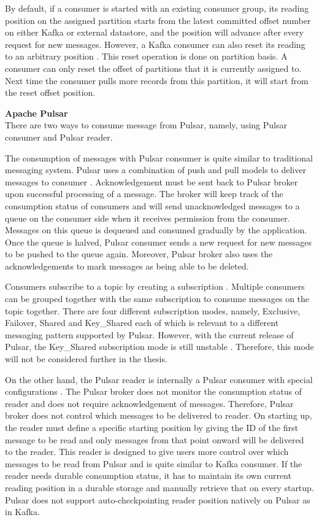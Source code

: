 By default, if a consumer is started with an existing consumer group, its reading position on the assigned partition starts from the latest committed offset number on either Kafka or external datastore, and the position will advance after every request for new messages. However, a Kafka consumer can also reset its reading to an arbitrary position \cite{kafkaconsumerimplement}. This reset operation is done on partition basis. A consumer can only reset the offset of partitions that it is currently assigned to. Next time the consumer pulls more records from this partition, it will start from the reset offset position.

\large \textbf{Apache Pulsar}\\
\normalsize
There are two ways to consume message from Pulsar, namely, using Pulsar consumer and Pulsar reader.

The consumption of messages with Pulsar consumer is quite similar to traditional messaging system. Pulsar uses a combination of push and pull models to deliver messages to consumer \cite{pulsarbinaryprotocol}. Acknowledgement must be sent back to Pulsar broker upon successful processing of a message. The broker will keep track of the consumption status of consumers and will send unacknowledged messages to a queue on the consumer side when it receives permission from the consumer. Messages on this queue is dequeued and consumed gradually by the application. Once the queue is halved, Pulsar consumer sends a new request for new messages to be pushed to the queue again. Moreover, Pulsar broker also uses the acknowledgements to mark messages as being able to be deleted.

Consumers subscribe to a topic by creating a subscription \cite{pulsarconsumersubscription}. Multiple consumers can be grouped together with the same subscription to consume messages on the topic together. There are four different subscription modes, namely, Exclusive, Failover, Shared and Key\_Shared each of which is relevant to a different messaging pattern supported by Pulsar. However, with the current release of Pulsar, the Key\_Shared subscription mode is still unstable \cite{pulsarkaysharedunstable}. Therefore, this mode will not be considered further in the thesis.

On the other hand, the Pulsar reader is internally a Pulsar consumer with special configurations \cite{pulsarreader}. The Pulsar broker does not monitor the consumption status of reader and does not require acknowledgement of messages. Therefore, Pulsar broker does not control which messages to be delivered to reader. On starting up, the reader must define a specific starting position by giving the ID of the first message to be read and only messages from that point onward will be delivered to the reader. This reader is designed to give users more control over which messages to be read from Pulsar and is quite similar to Kafka consumer. If the reader needs durable consumption status, it has to maintain its own current reading position in a durable storage and manually retrieve that on every startup. Pulsar does not support auto-checkpointing reader position natively on Pulsar as in Kafka. 

